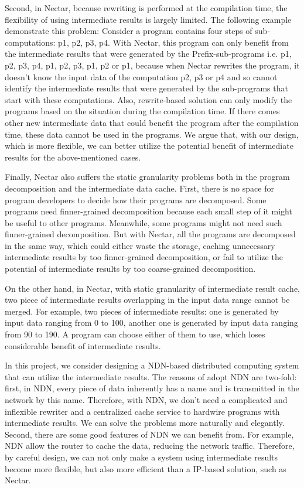 Second, in Nectar, because rewriting is performed at the compilation time, the
flexibility of using intermediate results is largely limited. The
following example demonstrate this problem: Consider a program
contains four steps of sub-computations: {p1, p2, p3, p4}. With Nectar, this program can only
benefit from the intermediate results that were generated by the
Prefix-sub-programs i.e. {p1, p2, p3, p4}, {p1, p2, p3}, {p1, p2} or
{p1}, because when Nectar rewrites the program, it doesn't know the
input data of the computation p2, p3 or p4 and so cannot identify the
intermediate results that were generated by the sub-programs that
start with these computations. Also, rewrite-based solution can only
modify the programs based on the situation during the compilation time. If
there comes other new intermediate data that could benefit the program after the
compilation time, these data cannot be used in the programs. We argue
that, with our design, which is more flexible, we can better utilize the
potential benefit of intermediate results for the above-mentioned
cases.

Finally, Nectar also suffers the static granularity problems both in
the program decomposition and the intermediate data cache. First, there is no space for
program developers to decide how their programs are decomposed. Some
programs need finner-grained decomposition because each small step of
it might be useful to other programs. Meanwhile, some programs might
not need such finner-grained decomposition. But with Nectar, all the programs
are decomposed in the same way, which could either waste the
storage, caching unnecessary intermediate results by too
finner-grained decomposition, or fail to utilize
the potential of intermediate results by too coarse-grained
decomposition. 

On the other hand, in Nectar, with static granularity of intermediate
result cache, two piece of intermediate results
overlapping in the input data range cannot be merged.
For example, two pieces of intermediate results: one is generated by
input data ranging from 0 to 100, another one is generated by input
data ranging from 90 to 190. A program can choose either of them to
use, which loses considerable benefit of intermediate results.

In this project, we consider designing a NDN-based distributed
computing system that can utilize the intermediate results. The
reasons of adopt NDN are two-fold: first, in NDN, every piece of data
inherently has a name and is transmitted in the network by this name.
Therefore, with NDN, we don't need a complicated and inflexible rewriter and a centralized cache
service to hardwire programs with intermediate results. We can solve the
problems more naturally and elegantly. Second, there are some good
features of NDN we can benefit from. For example, NDN allow the router
to cache the data, reducing the network traffic. Therefore, by careful design, we
can not only make a system using intermediate results become more
flexible, but also more efficient than a IP-based solution, such as
Nectar.

